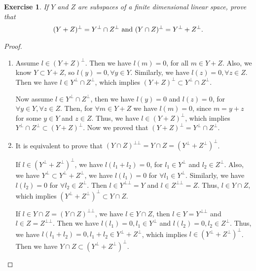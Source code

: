 \documentclass[11pt]{book}
\newtheorem{exercise}{Exercise}[section]
\theoremstyle{definition}
\numberwithin{equation}{subsection}
\begin{document}
\begin{exercise}
If $Y$ and $Z$ are subspaces of a finite dimensional linear space, prove that 
\begin{align*}
    (Y + Z)^\bot = Y^\bot \cap Z^\bot\,\,{\rm and}\,\, (Y \cap Z)^\bot = Y^\bot + Z^\bot.
\end{align*}
\end{exercise}
\begin{proof}
~\begin{enumerate}[label=(\arabic*)]
    \item Assume $l \in (Y+Z)^\bot$. Then we have $l(m) = 0$, for all $m \in Y+Z$. Also, we know $Y\subset Y+Z$, so $l(y) = 0, \forall y \in Y$. Similarly, we have $l(z) = 0, \forall z \in Z$. Then we have $l \in Y^\bot \cap Z^\bot$, which implies $(Y+Z)^\bot \subset Y^\bot \cap Z^\bot$.
    
    Now assume $l \in Y^\bot \cap Z^\bot$, then we have $l(y) = 0$ and $l(z) = 0$, for $\forall y \in Y, \forall z \in Z$. Then, for $\forall m \in Y+Z$ we have $l(m) = 0$, since $m = y + z$ for some $y \in Y$ and $z \in Z$. Thus, we have $l \in (Y+Z)^\bot$, which implies $Y^\bot \cap Z^\bot \subset (Y+Z)^\bot$. Now we proved that $(Y+Z)^\bot = Y^\bot \cap Z^\bot$.
    \item It is equivalent to prove that $(Y \cap Z)^{\bot\bot} = Y\cap Z = (Y^\bot + Z^\bot)^\bot$.
    
    
    If $l \in (Y^\bot + Z^\bot)^\bot$, we have $l(l_1 + l_2) = 0$, for $l_1 \in Y^\bot$ and $l_2 \in Z^\bot$. Also, we have $Y^\bot \subset Y^\bot + Z^\bot$, we have $l(l_1) = 0$ for $\forall l_1 \in Y^\bot$. Similarly, we have $l(l_2) = 0$ for $\forall l_2 \in Z^\bot$. Then $l \in Y^{\bot\bot} = Y$ and $l \in Z^{\bot\bot} = Z$. Thus, $l \in Y\cap Z$, which implies $(Y^\bot + Z^\bot)^\bot \subset Y\cap Z$.
    
    
    If $l \in Y\cap Z = (Y\cap Z)^{\bot\bot}$, we have $l \in Y\cap Z$, then $l \in Y = Y^{\bot\bot}$ and $l \in Z = Z^{\bot\bot}$. Then we have $l(l_1) = 0, l_1 \in Y^\bot$ and $l(l_2) = 0, l_2 \in Z^\bot$. Thus, we have $l(l_1 + l_2) = 0, l_1 + l_2 \in Y^\bot + Z^\bot$, which implies $l \in (Y^\bot + Z^\bot)^\bot$. Then we have $Y\cap Z \subset (Y^\bot + Z^\bot)^\bot$.
\end{enumerate}
\end{proof}

\medskip
\end{document}
